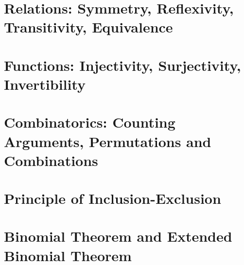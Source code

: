 \section{Relations: Symmetry, Reflexivity, Transitivity, Equivalence}
\label{sec:Relations}

\section{Functions: Injectivity, Surjectivity, Invertibility}
\label{sec:Functions}

\section{Combinatorics: Counting Arguments, Permutations and Combinations}
\label{sec:Combinatorics}

\section{Principle of Inclusion-Exclusion}
\label{sec:InclusionExclusion}

\section{Binomial Theorem and Extended Binomial Theorem}
\label{sec:BinomialTheorem}

